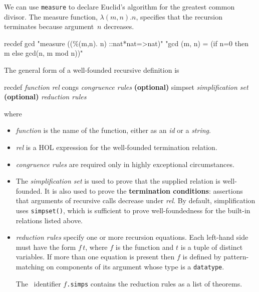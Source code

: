 We can use \texttt{measure} to declare Euclid's algorithm for the greatest
common divisor.  The measure function, $\lambda(m,n). n$, specifies that the
recursion terminates because argument~$n$ decreases.
\begin{ttbox}
recdef gcd "measure ((\%(m,n). n) ::nat*nat=>nat)"
    "gcd (m, n) = (if n=0 then m else gcd(n, m mod n))"
\end{ttbox}

The general form of a well-founded recursive definition is
\begin{ttbox}
recdef {\it function} {\it rel}
    congs   {\it congruence rules}      {\bf(optional)}
    simpset {\it simplification set}      {\bf(optional)}
   {\it reduction rules}
\end{ttbox}
where
\begin{itemize}
\item \textit{function} is the name of the function, either as an \textit{id}
  or a \textit{string}.  
  
\item \textit{rel} is a HOL expression for the well-founded termination
  relation.
  
\item \textit{congruence rules} are required only in highly exceptional
  circumstances.
  
\item The \textit{simplification set} is used to prove that the supplied
  relation is well-founded.  It is also used to prove the \textbf{termination
    conditions}: assertions that arguments of recursive calls decrease under
  \textit{rel}.  By default, simplification uses \texttt{simpset()}, which
  is sufficient to prove well-foundedness for the built-in relations listed
  above. 
  
\item \textit{reduction rules} specify one or more recursion equations.  Each
  left-hand side must have the form $f\,t$, where $f$ is the function and $t$
  is a tuple of distinct variables.  If more than one equation is present then
  $f$ is defined by pattern-matching on components of its argument whose type
  is a \texttt{datatype}.  

  The \ML\ identifier $f$\texttt{.simps} contains the reduction rules as
  a list of theorems.
\end{itemize}

